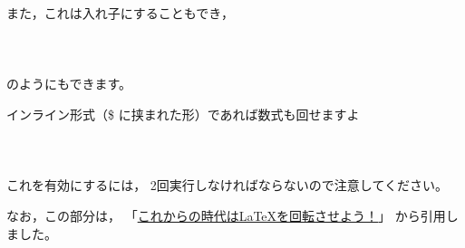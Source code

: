 また，これは入れ子にすることもでき，\\
\vspace{3zw} \\
\hspace{5zw}  \\
\vspace{3zw} \\
のようにもできます。

インライン形式（\$ に挟まれた形）であれば数式も回せますよ \\
\vspace{3zw} \\
\hspace{5zw}  \\
\vspace{3zw} \\

これを有効にするには，
2回実行しなければならないので注意してください。

なお，この部分は，
「\href{http://qiita.com/zr_tex8r/items/2dbaabff6a795661d413}{これからの時代はLaTeXを回転させよう！}」
から引用しました。

